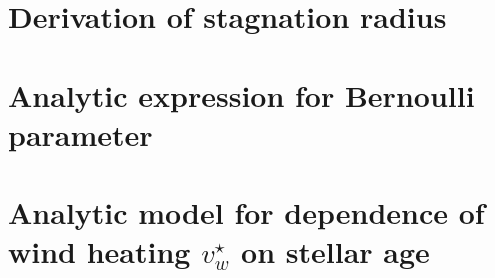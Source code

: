 \documentclass[usenatbib,fleqn]{mn2e}
\newcommand{\vwO}{v_{w}}
\begin{document}
  \clearpage
  \appendix
  \section{Derivation of stagnation radius}
  \label{app:rs}
  

  \section{Analytic expression for Bernoulli parameter}
  \label{app:be}
  

  \section{Analytic model for dependence of wind heating $\vwO^{\star}$ on stellar age}
\label{app:windheat}


  \footnotesize{
    
    
  }
\end{document}
